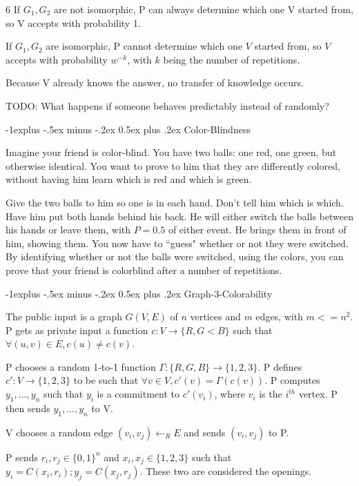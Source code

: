\documentclass[2pt]{scrartcl}
\makeatletter
\renewcommand{\subsection}{\@startsection{subsection}{2}{0mm}
  {-1explus -.5ex minus -.2ex}
  {0.5ex plus .2ex}
{\normalfont\normalsize\bfseries}}
\makeatother
\begin{document}
\begin{multicols}{6}
  If $G_1, G_2$ are not isomorphic, P can always determine which one V started from, so V accepts with probability 1.

  If $G_1, G_2$ are isomorphic, P cannot determine which one $V$ started from, so $V$ accepts with probability $w^{-k}$, with $k$ being the number of repetitions.

  Because V already knows the answer, no transfer of knowledge occurs.

  TODO: What happens if someone behaves predictably instead of randomly?

  \subsection{Color-Blindness}

  Imagine your friend is color-blind. You have two balls: one red, one green, but otherwise identical. You want to prove to him that they are differently colored, without having him learn which is red and which is green.

  Give the two balls to him so one is in each hand. Don't tell him which is which. Have him put both hands behind his back. He will either switch the balls between his hands or leave them, with $P = 0.5$ of either event. He brings them in front of him, showing them. You now have to ``guess" whether or not they were switched. By identifying whether or not the balls were switched, using the colors, you can prove that your friend is colorblind after a number of repetitions.

  \subsection{Graph-3-Colorability}

  The public input is a graph $G(V, E)$ of $n$ vertices and $m$ edges, with $m <= n^2$. P gets as private input a function $c: V \rightarrow \{R, G< B\}$ such that $\forall (u, v) \in E, c(u) \neq c(v)$.

  P chooses a random 1-to-1 function $\Gamma: \{R, G, B\} \rightarrow \{1, 2, 3\}$. P defines $c': V \rightarrow \{1, 2, 3\}$ to be such that $\forall v \in V, c'(v) = \Gamma(c(v))$. P computes $y_1, ..., y_n$ such that $y_i$ is a commitment to $c'(v_i)$, where $v_i$ is the $i^{th}$ vertex. P then sends $y_1, ..., y_n$ to V.

  V chooses a random edge $(v_i, v_j) \leftarrow_R E$ and sends $(v_i, v_j)$ to P.

  P sends $r_i, r_j \in \{0, 1\}^n$ and $x_i, x_j \in \{1, 2, 3\}$ such that $y_i = C(x_i, r_i); y_j = C(x_j, r_j)$. These two are considered the openings.


\end{multicols}
\end{document}
